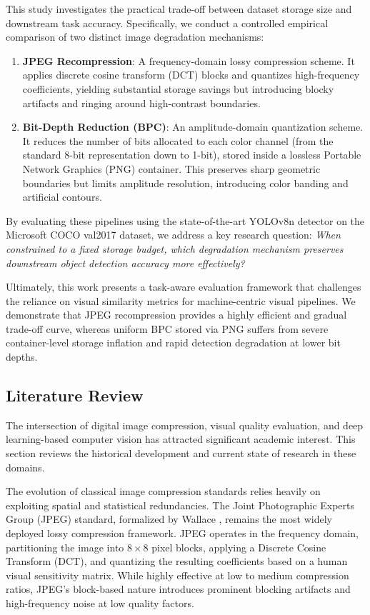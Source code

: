 \documentclass[12pt, a4paper]{article}
\begin{document}
This study investigates the practical trade-off between dataset storage size and downstream task accuracy. Specifically, we conduct a controlled empirical comparison of two distinct image degradation mechanisms:
\begin{enumerate}
    \item \textbf{JPEG Recompression}: A frequency-domain lossy compression scheme. It applies discrete cosine transform (DCT) blocks and quantizes high-frequency coefficients, yielding substantial storage savings but introducing blocky artifacts and ringing around high-contrast boundaries.
    \item \textbf{Bit-Depth Reduction (BPC)}: An amplitude-domain quantization scheme. It reduces the number of bits allocated to each color channel (from the standard 8-bit representation down to 1-bit), stored inside a lossless Portable Network Graphics (PNG) container. This preserves sharp geometric boundaries but limits amplitude resolution, introducing color banding and artificial contours.
\end{enumerate}

By evaluating these pipelines using the state-of-the-art YOLOv8n detector on the Microsoft COCO val2017 dataset, we address a key research question: \textit{When constrained to a fixed storage budget, which degradation mechanism preserves downstream object detection accuracy more effectively?} 

Ultimately, this work presents a task-aware evaluation framework that challenges the reliance on visual similarity metrics for machine-centric visual pipelines. We demonstrate that JPEG recompression provides a highly efficient and gradual trade-off curve, whereas uniform BPC stored via PNG suffers from severe container-level storage inflation and rapid detection degradation at lower bit depths.

\subsection{Literature Review}
The intersection of digital image compression, visual quality evaluation, and deep learning-based computer vision has attracted significant academic interest. This section reviews the historical development and current state of research in these domains.

The evolution of classical image compression standards relies heavily on exploiting spatial and statistical redundancies. The Joint Photographic Experts Group (JPEG) standard, formalized by Wallace \cite{wallace1992}, remains the most widely deployed lossy compression framework. JPEG operates in the frequency domain, partitioning the image into $8\times8$ pixel blocks, applying a Discrete Cosine Transform (DCT), and quantizing the resulting coefficients based on a human visual sensitivity matrix. While highly effective at low to medium compression ratios, JPEG's block-based nature introduces prominent blocking artifacts and high-frequency noise at low quality factors.
\end{document}
